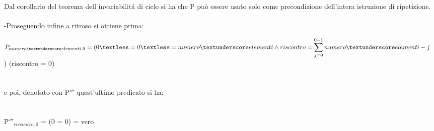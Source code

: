 \documentclass[11pt, a4paper, titlepage, block]{article}
\begin{document}
Dal corollario del teorema dell invariabilit\'a di ciclo si ha che P pu\`o essere usato solo come precondizione dell'intera istruzione di ripetizione.
\\
\\
-Proseguendo infine a ritroso si ottiene prima:

 $P_{numero\textunderscore elementi,0} = ( 0\textless= 0\textless= numero\textunderscore elementi \wedge riscontro = \displaystyle \sum_{j=0}^{0-1} numero\textunderscore elementi - j$) (riscontro = 0) 
 \\
 \\
 \\
 e poi, denotato con P$'''$ quest'ultimo predicato si ha:
 \\
 \\
 \\
 P$'''$$_{riscontro,0}$ = (0 = 0) = vero
\end{document}

